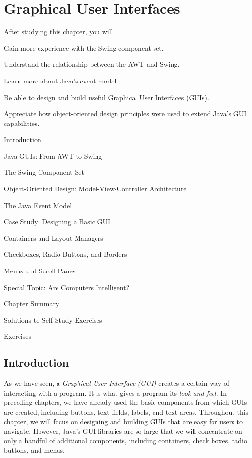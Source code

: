 
\setcounter{SSTUDYcount}{1}
\setcounter{chapter}{12}
\chapter{Graphical User Interfaces}
\label{chapter-guis}


\CObegin
{}
\noindent After studying this chapter, you will

\begin{COBL}
\item  Gain more experience with the Swing component set.
\item  Understand the relationship between the AWT and Swing.
\item  Learn more about Java's event model.
\item  Be able to design and build useful Graphical User Interfaces (GUIs).
\item  Appreciate how object-oriented design principles were used to
 extend Java's GUI capabilities.
\end{COBL}

\begin{COL}
\item {Introduction}
\item {Java GUIs: From AWT to Swing}
\item {The Swing Component Set}
\item {Object-Oriented Design: Model-View-Controller Architecture}
\item {The Java Event Model}
\item {Case Study: Designing a Basic GUI}
\item {Containers and Layout Managers}
\item {Checkboxes, Radio Buttons, and Borders}
\item {Menus and Scroll Panes}
\item[] {{\color{cyan}Special Topic:} Are Computers Intelligent?}
\par\small\item[] {Chapter Summary}
\par\small\item[] {Solutions to Self-Study Exercises}
\par\small\item[] {Exercises}
\end{COL}
\COend


\section{Introduction}
\noindent As we have seen, a {\it Graphical User Interface (GUI)}
creates a certain way of interacting with a program.  It is what gives
a program its {\it look and feel}. In preceding chapters, we have
already used the basic components from which GUIs are created,
including buttons, text fields, labels, and text areas.  Throughout
this chapter, we will focus on designing and building GUIs that are
easy for users to navigate.  However, Java's GUI libraries are so
large that we will concentrate on only a handful of additional
components, including containers, check boxes, radio buttons, and
menus.

